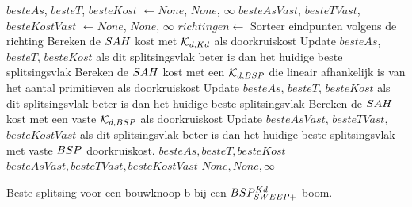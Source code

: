\begin{dutchalgorithm}
    \begin{algorithmic}       
            \State $besteAs$, $besteT$, $besteKost$ $\gets None$, $None$, $\infty$
            \State $besteAsVast$, $besteTVast$, $besteKostVast$ $\gets None$, $None$, $\infty$
            \State $richtingen \gets $ 
                \State Sorteer eindpunten volgens de richting
                        \State Bereken de $SAH$ kost met $\mathcal{K}_{d,Kd}$ als doorkruiskost
                        \State Update $besteAs$, $besteT$, $besteKost$ als dit splitsingsvlak beter is dan het huidige beste splitsingsvlak
                    \EndFor   
                \Else
                        \State Bereken de $SAH$ kost met een $\mathcal{K}_{d,BSP}$ die lineair afhankelijk is van het aantal primitieven als doorkruiskost 
                        \State Update $besteAs$, $besteT$, $besteKost$ als dit splitsingsvlak beter is dan het huidige beste splitsingsvlak 
                        \State Bereken de $SAH$ kost met een vaste $\mathcal{K}_{d,BSP}$ als doorkruiskost
                        \State Update $besteAsVast$, $besteTVast$, $besteKostVast$ als dit splitsingsvlak beter is dan het huidige beste splitsingsvlak met vaste $BSP$ doorkruiskost. 
                \EndFor
                \EndIf   
            \EndFor
                \State \Return $besteAs, besteT, besteKost$
            \EndIf
                \State \Return $besteAsVast, besteTVast, besteKostVast$
            \EndIf
            \State \Return $None, None, \infty$
        \EndFunction
    \end{algorithmic}
    \caption{Beste splitsing voor een bouwknoop b bij een $BSP^{Kd}_{SWEEP+}$  boom.}
    \label{alg:bspsweepfastkd-beste-split}
\end{dutchalgorithm}

